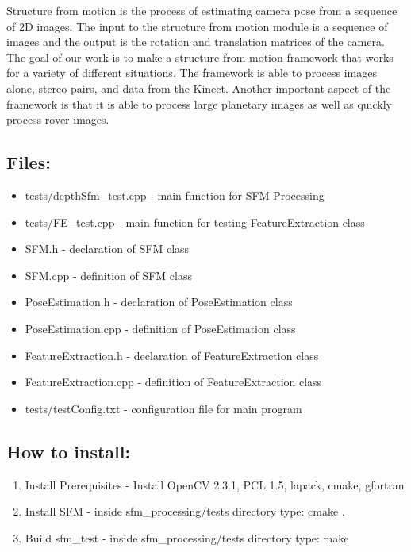Structure from motion is the process of estimating camera pose from a sequence of 2D images. The input to the structure from motion module is a sequence of images and the output is the rotation and translation matrices of the camera. The goal of our work is to make a structure from motion framework that works for a variety of different situations. The framework is able to process images alone, stereo pairs, and data from the Kinect. Another important aspect of the framework is that it is able to process large planetary images as well as quickly process rover images.

\subsection{Files:}
\begin{itemize}
	\item{tests/depthSfm\_test.cpp} - main function for SFM Processing
	\item{tests/FE\_test.cpp} - main function for testing FeatureExtraction class
	\item{SFM.h} - declaration of SFM class
	\item{SFM.cpp} - definition of SFM class
	\item{PoseEstimation.h} - declaration of PoseEstimation class
	\item{PoseEstimation.cpp} - definition of PoseEstimation class
	\item{FeatureExtraction.h} - declaration of FeatureExtraction class
	\item{FeatureExtraction.cpp} - definition of FeatureExtraction class
	\item{tests/testConfig.txt} - configuration file for main program
\end{itemize}


\subsection{How to install:}
\begin{enumerate}
	\item{Install Prerequisites} - Install OpenCV 2.3.1, PCL 1.5, lapack, cmake, gfortran
	\item{Install SFM} - inside sfm\_processing/tests directory type: cmake .
	\item{Build sfm\_test} - inside sfm\_processing/tests directory type: make
\end{enumerate}

